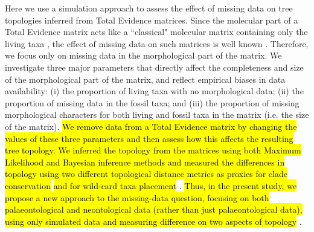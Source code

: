\documentclass[12pt,letterpaper]{article}
\begin{document}
Here we use a simulation approach to assess the effect of missing data on tree topologies inferred from Total Evidence matrices.
Since the molecular part of a Total Evidence matrix acts like a ``classical" molecular matrix containing only the living taxa \citep{ronquista2012}, the effect of missing data on such matrices is well known \citep{wiensmissing2006,wiensmissing2008,lemmonthe2009,rouresite-specific2011}.
Therefore, we focus only on missing data in the morphological part of the matrix.
We investigate three major parameters that directly affect the completeness and size of the morphological part of the matrix, and reflect empirical biases in data availability: (i) the proportion of living taxa with no morphological data; (ii) the proportion of missing data in the fossil taxa; and (iii) the proportion of missing morphological characters for both living and fossil taxa in the matrix (i.e. the size of the matrix).
\hl{We remove data from a Total Evidence matrix by changing the values of these three parameters and then assess how this affects the resulting tree topology.
We inferred the topology from the matrices using both Maximum Likelihood and Bayesian inference methods and measured the differences in topology using two different topological distance metrics as proxies for clade conservation } \citep[\hl{based on the Robinson-Foulds distance;}][]{RF1981}\hl{ and for wild-card taxa placement }\citep[\hl{based on the Triplets distance;}][]{critchlowthe1996}.
\hl{Thus, in the present study, we propose a new approach to the missing-data question, focusing on both palaeontological and neontological data (rather than just palaeontological data), using only simulated data and measuring difference on two aspects of topology }\citep[c.f.][\hl{measuring respectively only the clades support or the number of shared clades}]{Wiens01102005,pattinsonphylogeny2014}.
\end{document}

